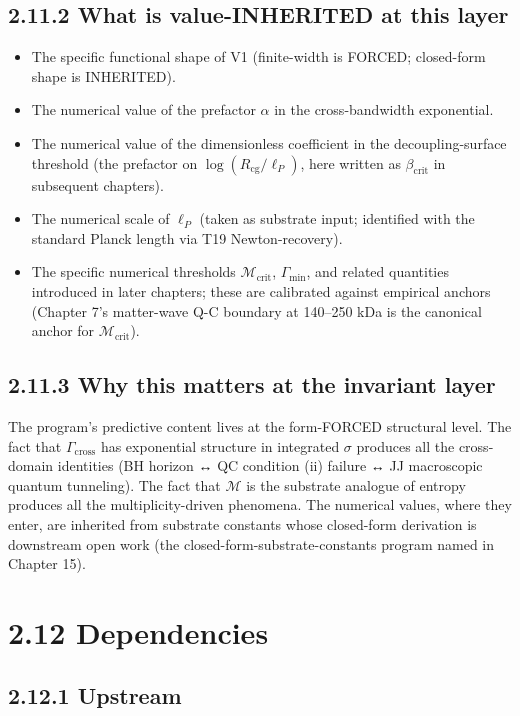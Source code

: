 \documentclass[11pt]{book}
\begin{document}
\subsection{2.11.2 What is value-INHERITED at this layer}

\begin{itemize}
\item The specific functional shape of V1 (finite-width is FORCED; closed-form shape is INHERITED).
\item The numerical value of the prefactor $\alpha$ in the cross-bandwidth exponential.
\item The numerical value of the dimensionless coefficient in the decoupling-surface threshold (the prefactor on $\log(R_\mathrm{cg}/\ell_P)$, here written as $\beta_\mathrm{crit}$ in subsequent chapters).
\item The numerical scale of $\ell_P$ (taken as substrate input; identified with the standard Planck length via T19 Newton-recovery).
\item The specific numerical thresholds $\mathcal{M}_\mathrm{crit}$, $\Gamma_\mathrm{min}$, and related quantities introduced in later chapters; these are calibrated against empirical anchors (Chapter 7's matter-wave Q-C boundary at 140–250 kDa is the canonical anchor for $\mathcal{M}_\mathrm{crit}$).
\end{itemize}

\subsection{2.11.3 Why this matters at the invariant layer}

The program's predictive content lives at the form-FORCED structural level. The fact that $\Gamma_\mathrm{cross}$ has exponential structure in integrated $\sigma$ produces all the cross-domain identities (BH horizon ↔ QC condition (ii) failure ↔ JJ macroscopic quantum tunneling). The fact that $\mathcal{M}$ is the substrate analogue of entropy produces all the multiplicity-driven phenomena. The numerical values, where they enter, are inherited from substrate constants whose closed-form derivation is downstream open work (the closed-form-substrate-constants program named in Chapter 15).

\section{2.12 Dependencies}

\subsection{2.12.1 Upstream}
\end{document}
